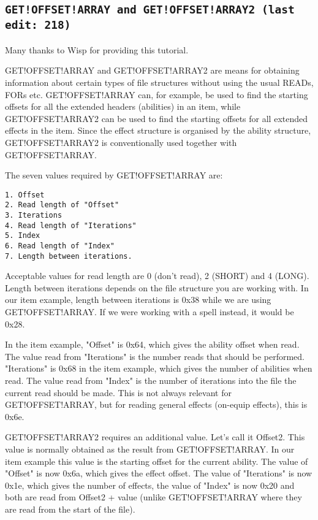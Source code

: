 \documentclass{article}
\begin{document}
\label{sec-get-offset-array12}\subsection{\tt{GET!OFFSET!ARRAY} and \tt{GET!OFFSET!ARRAY2} (last edit: 218)}

Many thanks to Wisp for providing this tutorial.

GET!OFFSET!ARRAY and GET!OFFSET!ARRAY2 are means for obtaining information about certain types of file structures without using the usual READs, FORs etc. GET!OFFSET!ARRAY can, for example, be used to find the starting offsets for all the extended headers (abilities) in an item, while GET!OFFSET!ARRAY2 can be used to find the starting offsets for all extended effects in the item. Since the effect structure is organised by the ability structure, GET!OFFSET!ARRAY2 is conventionally used together with GET!OFFSET!ARRAY.

The seven values required by GET!OFFSET!ARRAY are:
\begin{verbatim}
1. Offset
2. Read length of "Offset"
3. Iterations
4. Read length of "Iterations"
5. Index
6. Read length of "Index"
7. Length between iterations.
\end{verbatim}

Acceptable values for read length are 0 (don't read), 2 (SHORT) and 4 (LONG). Length between iterations depends on the file structure you are working with. In our item example, length between iterations is 0x38 while we are using GET!OFFSET!ARRAY. If we were working with a spell instead, it would be 0x28.

In the item example, "Offset" is 0x64, which gives the ability offset when read.
The value read from "Iterations" is the number reads that should be performed. "Iterations" is 0x68 in the item example, which gives the number of abilities when read.
The value read from "Index" is the number of iterations into the file the current read should be made. This is not always relevant for GET!OFFSET!ARRAY, but for reading general effects (on-equip effects), this is 0x6e.

GET!OFFSET!ARRAY2 requires an additional value. Let's call it Offset2. This value is normally obtained as the result from GET!OFFSET!ARRAY. In our item example this value is the starting offset for the current ability. The value of "Offset" is now 0x6a, which gives the effect offset. The value of "Iterations" is now 0x1e, which gives the number of effects, the value of "Index" is now 0x20 and both are read from Offset2 + value (unlike GET!OFFSET!ARRAY where they are read from the start of the file).
\end{document}
